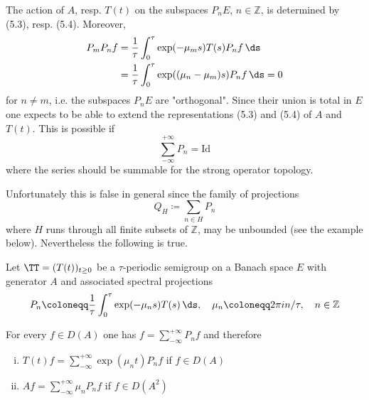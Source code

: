 The action of $A$, resp. $T(t)$ on the subspaces $P_{n}E$, $n \in \mathbb{Z}$, is determined by (5.3), resp. (5.4).
Moreover,
\begin{align*}
P_{m}P_{n}f &=  \frac{1}{\tau}\int_{0}^{\tau} \exp(-\mu_{m}s)T(s)P_{n}f \, \ds \\
&=  \frac{1}{\tau}\int_{0}^{\tau} \exp((\mu_{n}-\mu_{m})s)P_{n}f \, \ds = 0
\end{align*}
for $n \neq m$, i.e. the subspaces $P_{n}E$ are "orthogonal".
Since their union is total in $E$ one expects to be able to extend the representations (5.3) and (5.4) of $A$ and $T(t)$.
This is possible if
\[
\sum_{-\infty}^{+\infty} P_{n} = \text{Id}
\]
where the series should be summable for the strong operator topology.

Unfortunately this is false in general since the family of projections
\[
Q_{H} \coloneqq \sum_{n \in H} P_{n}
\]
where $H$ runs through all finite subsets of $\mathbb{Z}$, may be unbounded (see the example below).
Nevertheless the following is true.


\newpage
\begin{theorem}\label{thm:a3-5.4}

Let $\TT = (T(t))_{t \geq 0}$ be a $\tau$-periodic semigroup on a Banach space $E$ with generator $A$ and associated spectral projections
\[
P_{n} \coloneqq  \frac{1}{\tau}\int_{0}^{\tau} \exp(-\mu_{n}s)T(s) \, \ds, \quad \mu_{n} \coloneqq 2\pi in/\tau, \quad n \in \mathbb{Z}
\]

For every $f \in D(A)$ one has $f = \sum_{-\infty}^{+\infty} P_{n}f$ and therefore
\begin{enumerate}[(i)]
\item $T(t)f = \sum_{-\infty}^{+\infty} \exp(\mu_{n}t)P_{n}f$ \quad if $f \in D(A)$

\item $Af = \sum_{-\infty}^{+\infty} \mu_{n}P_{n}f$ \quad if $f \in D(A^{2})$
\end{enumerate}
\end{theorem}

